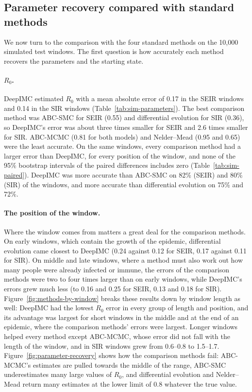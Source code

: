 \documentclass[12pt]{article}
\begin{document}
\subsection{Parameter recovery compared with standard methods}\label{sec:res-sim-params}

We now turn to the comparison with the four standard methods on the 10,000 simulated test windows. The
first question is how accurately each method recovers the parameters and the starting state.

\paragraph{$R_0$.} DeepIMC estimated $R_0$ with a mean absolute error of 0.17 in the SEIR windows and
0.14 in the SIR windows (Table~\ref{tab:sim-parameters}). The best comparison method was ABC-SMC for
SEIR (0.55) and differential evolution for SIR (0.36), so DeepIMC's error was about three times smaller
for SEIR and 2.6 times smaller for SIR. ABC-MCMC (0.81 for both models) and Nelder--Mead (0.95 and 0.65)
were the least accurate. On the same windows, every comparison method had a larger error than DeepIMC,
for every position of the window, and none of the 95\% bootstrap intervals of the paired differences
includes zero (Table~\ref{tab:sim-paired}). DeepIMC was more accurate than ABC-SMC on 82\% (SEIR) and
80\% (SIR) of the windows, and more accurate than differential evolution on 75\% and 72\%.

\paragraph{The position of the window.} Where the window comes from matters a great deal for the
comparison methods. On early windows, which contain the growth of the epidemic, differential evolution
came closest to DeepIMC (0.24 against 0.12 for SEIR, 0.17 against 0.11 for SIR). On middle and late
windows, where a method must also work out how many people were already infected or immune, the errors
of the comparison methods were two to four times larger than on early windows, while DeepIMC's errors
grew much less (to 0.16 and 0.25 for SEIR, 0.13 and 0.18 for SIR). Figure~\ref{fig:methods-by-window} breaks
these results down by window length as well: DeepIMC had the lowest $R_0$ error in every group of length and
position, and its advantage was largest for short windows in the middle and at the end of an epidemic, where
the comparison methods' errors were largest. Longer windows helped every method except ABC-MCMC, whose error
did not fall with the length of the window, and in SIR windows grew from 0.6--0.8 to 1.5--1.7. Figure~\ref{fig:parameter-recovery}
shows how the comparison methods fail: ABC-MCMC's estimates are pulled towards the middle of the range,
ABC-SMC underestimates many large values of $R_0$, and differential evolution and Nelder--Mead return
many estimates at the lower limit of 0.8 whatever the true value.
\end{document}
